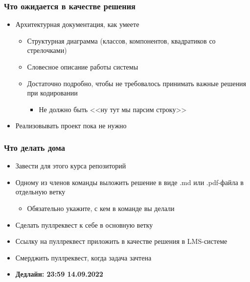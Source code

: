 \documentclass{../mcsslides}
\begin{document}
    \begin{frame}
        \frametitle{Что ожидается в качестве решения}
        \begin{itemize}
            \item Архитектурная документация, как умеете
            \begin{itemize}
                \item Структурная диаграмма (классов, компонентов, квадратиков со стрелочками)
                \item Словесное описание работы системы
                \item Достаточно подробно, чтобы не требовалось принимать важные решения при кодировании
                \begin{itemize}
                    \item Не должно быть <<ну тут мы парсим строку>>
                \end{itemize}
            \end{itemize}
            \item Реализовывать проект пока не нужно
        \end{itemize}
    \end{frame}

    \begin{frame}
        \frametitle{Что делать дома}
        \begin{itemize}
            \item Завести для этого курса репозиторий
            \item Одному из членов команды выложить решение в виде .md или .pdf-файла в отдельную ветку
            \begin{itemize}
                \item Обязательно укажите, с кем в команде вы делали
            \end{itemize}
            \item Сделать пуллреквест к себе в основную ветку
            \item Ссылку на пуллреквест приложить в качестве решения в LMS-системе
            \item Смерджить пуллреквест, когда задача зачтена
            \item \textbf{Дедлайн: 23:59 14.09.2022}
        \end{itemize}
    \end{frame}
\end{document}

